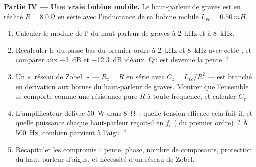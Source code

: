\begin{problem}
\medskip
\noindent\textbf{Partie IV --- Une vraie bobine mobile.}
Le haut-parleur de graves est en réalité $R = \qty{8.0}{\ohm}$ en série
avec l'inductance de sa bobine mobile $L_{vc} = \qty{0.50}{mH}$.
\begin{enumerate}[resume]
  \item Calculer le module de l' du haut-parleur de graves à
        \qty{2}{kHz} et à \qty{8}{kHz}.
  \item Recalculer le  du passe-bas du premier ordre à \qty{2}{kHz}
        et \qty{8}{kHz} avec cette , et comparer aux
        \qty{-3}{dB} et \qty{-12.3}{dB} idéaux. Qu'est devenue la pente~?
  \item Un «~réseau de Zobel~» --- $R_z = R$ en série avec $C_z =
        L_{vc}/R^2$ --- est branché en dérivation aux bornes du
        haut-parleur de graves. Montrer que l'ensemble se comporte comme
        une résistance pure $R$ à toute fréquence, et calculer $C_z$.
  \item L'amplificateur délivre \qty{50}{W} dans \qty{8}{\ohm}~: quelle
        tension efficace cela fait-il, et quelle puissance chaque
        haut-parleur reçoit-il en $f_c$ ( du premier ordre)~? À
        \qty{500}{Hz}, combien parvient à l'aigu~?
  \item Récapituler les compromis~: pente, phase, nombre de composants,
        protection du haut-parleur d'aigus, et nécessité d'un réseau de
        Zobel.
\end{enumerate}
\end{problem}

